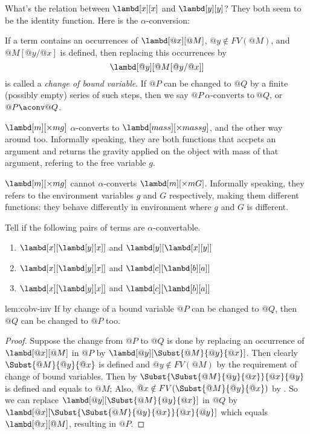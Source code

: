 \documentclass[../../../include/open-logic-section]{subfiles}
\begin{document}

What's the relation between $\lambd[x][x]$ and $\lambd[y][y]$? They
both seem to be the identity function. Here is the $\alpha$-conversion:

\begin{defn}
  If a term contains an occurrences of $\lambd[@x][@M]$, $@y \notin
  FV(@M)$, and $@M[@y/@x]$ is defined, then replacing this occurrences
  by 
  \begin{equation*}
    \lambd[@y][@M[@y/@x]]
  \end{equation*}
  is called a \emph{change of bound
    variable}. If $@P$ can be changed to $@Q$ by a finite (possibly
  empty) series of such steps, then we say $@P ~\alpha\text{-converts to}~ @Q$,
  or $@P \aconv @Q$.
\end{defn}

\begin{ex}
  $\lambd[m][\times m g]$ $\alpha$-converts to $\lambd[mass][\times mass
  g]$, and the other way around too. Informally
  speaking, they are both functions that accpets an argument and
  returns the gravity applied on the object with mass of that argument,
  refering to the free variable $g$.
\end{ex}
\begin{ex}
  $\lambd[m][\times m g]$ cannot $\alpha$-converts $\lambd[m][\times m
  G]$. Informally speaking, they refers to the environment variables $g$ and $G$ respectively,
  making them different functions: they behave differently in
  environment where $g$ and $G$ is different.
\end{ex}

\begin{prob}
  Tell if the following pairs of terms are $\alpha$-convertable.
  \begin{enumerate}
  \item $\lambd[x][\lambd[y][x]]$ and $\lambd[y][\lambd[x][y]]$
  \item $\lambd[x][\lambd[y][x]]$ and $\lambd[c][\lambd[b][a]]$
  \item $\lambd[x][\lambd[y][x]]$ and $\lambd[c][\lambd[b][a]]$
  \end{enumerate}
\end{prob}

\begin{lem}{lem:cobv-inv}
  If by change of a bound variable $@P$ can be changed to $@Q$, then $@Q$
  can be changed to $@P$ too.
\end{lem}
\begin{proof}
  Suppose the change from $@P$ to $@Q$ is done by replacing an
  occurrence of $\lambd[@x][@M]$ in $@P$ by
  $\lambd[@y][\Subst{@M}{@y}{@x}]$. Then clearly $\Subst{@M}{@y}{@x}$
  is defined and $@y \notin FV(@M)$ by the requirement of change of
  bound variables. Then by 
  $\Subst{\Subst{@M}{@y}{@x}}{@x}{@y}$ is defined and
  equals to $@M$; Also, $@x \notin FV(\Subst{@M}{@y}{@x})$ by
  . So we can replace $\lambd[@y][\Subst{@M}{@y}{@x}]$ in
  $@Q$ by $\lambd[@x][\Subst{\Subst{@M}{@y}{@x}}{@x}{@y}]$ which equals
  $\lambd[@x][@M]$, resulting in $@P$.
\end{proof}
\end{document}
